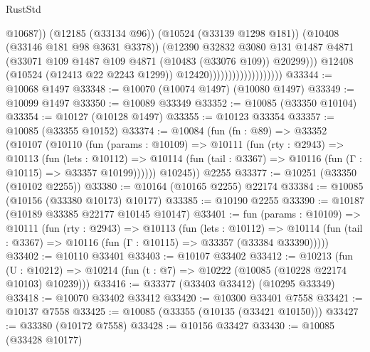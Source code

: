 \begin{lexlean}{RustStd}
\begin{coremodule}
                                                @10687))
                                            (@12185 (@33134 @96))
                                            (@10524 (@33139 @1298 @181))
                                            (@10408 (@33146 @181 @98 @3631 @3378))
                                            (@12390
                                              @32832
                                              @3080
                                              @131
                                              @1487
                                              @4871
                                              (@33071
                                                @109
                                                @1487
                                                @109
                                                @4871
                                                (@10483 (@33076 @109))
                                                @20299)))
                                          @12408
                                          (@10524 (@12413 @22 @2243 @1299))
                                          @12420)))))))))))))))))))
@33344 := @10068 @1497
@33348 := @10070 (@10074 @1497) (@10080 @1497)
@33349 := @10099 @1497
@33350 := @10089 @33349
@33352 := @10085 (@33350 @10104)
@33354 := @10127 (@10128 @1497)
@33355 := @10123 @33354
@33357 := @10085 (@33355 @10152)
@33374 := @10084
    (fun (fn : @89) =>
    @33352
      (@10107
        (@10110
          (fun (params : @10109) =>
          @10111
            (fun (rty : @2943) =>
            @10113
              (fun (lets : @10112) =>
              @10114 (fun (tail : @3367) => @10116 (fun (Γ : @10115) => @33357 @10199))))))
        @10245))
    @2255
@33377 := @10251 (@33350 (@10102 @2255))
@33380 := @10164 (@10165 @2255) @22174
@33384 := @10085 (@10156 (@33380 @10173) @10177)
@33385 := @10190 @2255
@33390 := @10187 (@10189 @33385 @22177 @10145 @10147)
@33401 := fun (params : @10109) =>
  @10111
    (fun (rty : @2943) =>
    @10113
      (fun (lets : @10112) =>
      @10114 (fun (tail : @3367) => @10116 (fun (Γ : @10115) => @33357 (@33384 @33390)))))
@33402 := @10110 @33401
@33403 := @10107 @33402
@33412 := @10213
    (fun (U : @10212) => @10214 (fun (t : @7) => @10222 (@10085 (@10228 @22174 @10103) @10239)))
@33416 := @33377 (@33403 @33412) (@10295 @33349)
@33418 := @10070 @33402 @33412
@33420 := @10300 @33401 @7558
@33421 := @10137 @7558
@33425 := @10085 (@33355 (@10135 (@33421 @10150)))
@33427 := @33380 (@10172 @7558)
@33428 := @10156 @33427
@33430 := @10085 (@33428 @10177)

\end{coremodule}
\end{lexlean}
